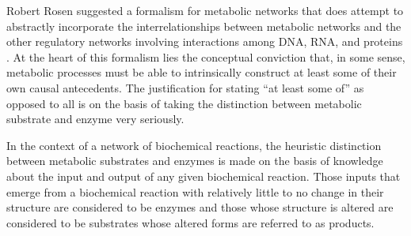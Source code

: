 Robert Rosen suggested a formalism for metabolic networks that does attempt to abstractly incorporate the interrelationships between metabolic networks and the other regulatory networks involving interactions among DNA, RNA, and proteins \cite{Rosen1972,Rosen1991}. At the heart of this formalism lies the conceptual conviction that, in some sense, metabolic processes must be able to intrinsically construct at least some of their own causal antecedents. The justification for stating ``at least some of'' as opposed to all is on the basis of taking the distinction between metabolic substrate and enzyme very seriously.

In the context of a network of biochemical reactions, the heuristic distinction between metabolic substrates and enzymes is made on the basis of knowledge about the input and output of any given biochemical reaction. Those inputs that emerge from a biochemical reaction with relatively little to no change in their structure are considered to be enzymes and those whose structure is altered are considered to be substrates whose altered forms are referred to as products. 

